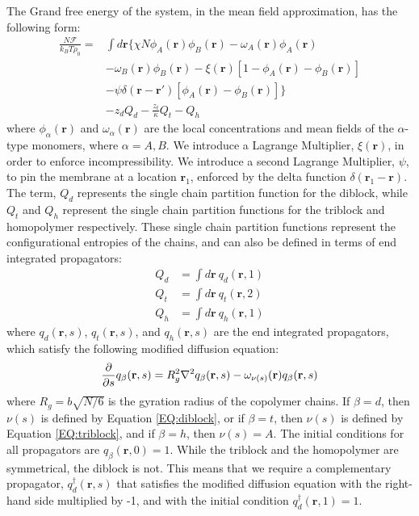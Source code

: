 \documentclass[twocolumn,aps,floatfix,nobibnotes]{revtex4-1}
\begin{document}
The Grand free energy of the system, in the mean field approximation, has the following form:
\begin{equation}
	\begin{aligned}
\frac{N \mathscr{F}}{k_B T \rho_0}  = & \int d \textbf{r} \bigg\lbrace \chi N \phi_A (\textbf{r}) 			\phi_B(\textbf{r}) - \omega_A (\textbf{r})\phi_A (\textbf{r})  \\
 &-  \omega_B(\textbf{r})\phi_B(\textbf{r}) - \xi(\textbf{r}) [ 1 -\phi_A (\textbf{r})  - \phi_B(\textbf{r})] \\
&- \psi \delta (\textbf{r} - \textbf{r}') [\phi_A (\textbf{r})  - \phi_B(\textbf{r})] \bigg\rbrace \\
&- z_d Q_d - 	\frac{z_t}{\kappa}  Q_t - Q_h
	\end{aligned}
\end{equation}
where $\phi_{\alpha} (\textbf{r})$ and $\omega_{\alpha} (\textbf{r})$ are the local concentrations and mean fields of the $\alpha$-type monomers, where $\alpha = A,B$. We introduce a Lagrange Multiplier, $\xi (\textbf{r})$, in order to enforce incompressibility. We introduce a second Lagrange Multiplier, $\psi$, to pin the membrane at a location $\textbf{r}_1$, enforced by the delta function $\delta (\textbf{r}_1 - \textbf{r})$. The term, $Q_d$ represents the single chain partition function for the diblock, while $Q_t$ and $Q_h$ represent the single chain partition functions for the triblock and homopolymer respectively. These single chain partition functions represent the configurational entropies of the chains, and can also be defined in terms of end integrated propagators:
\begin{align}
Q_d &= \int d \textbf{r} \ q_d (\textbf{r},1) \\
Q_t &= \int d \textbf{r} \ q_t (\textbf{r},2) \\
Q_h &= \int d \textbf{r} \ q_h (\textbf{r},1) 
\end{align} 
where $q_d(\textbf{r},s)$, $q_t (\textbf{r},s)$, and $q_h (\textbf{r},s)$ are the end integrated propagators, which satisfy the following modified diffusion equation:
\begin{equation} \label{EQ:Difusion_EQ}
\frac{\partial}{\partial s} q_{\beta} (\textbf{r},s)  = R_g^2 \nabla^2 q_{\beta} (\textbf{r},s) - \omega_{\small{\small{\nu(s)}}} (\textbf{r}) q_{\beta} (\textbf{r},s)
\end{equation}
where $R_g = b \sqrt{N/6}$ is the gyration radius of the copolymer chains. If $\beta = d$, then $\nu(s)$ is defined by Equation \ref{EQ:diblock}, or if $\beta = t$, then $\nu(s)$ is defined by Equation \ref{EQ:triblock}, and if $\beta = h$, then $\nu(s) = A$. The initial conditions for all propagators are $q_{\beta}(\textbf{r},0) = 1$. While the triblock and the homopolymer are symmetrical, the diblock is not. This means that we require a complementary propagator, $q_d^{\dagger} (\textbf{r},s)$ that satisfies the modified diffusion equation with the right-hand side multiplied by -1, and with the initial condition $q_d^{\dagger} (\textbf{r},1) =1$.
\end{document}
